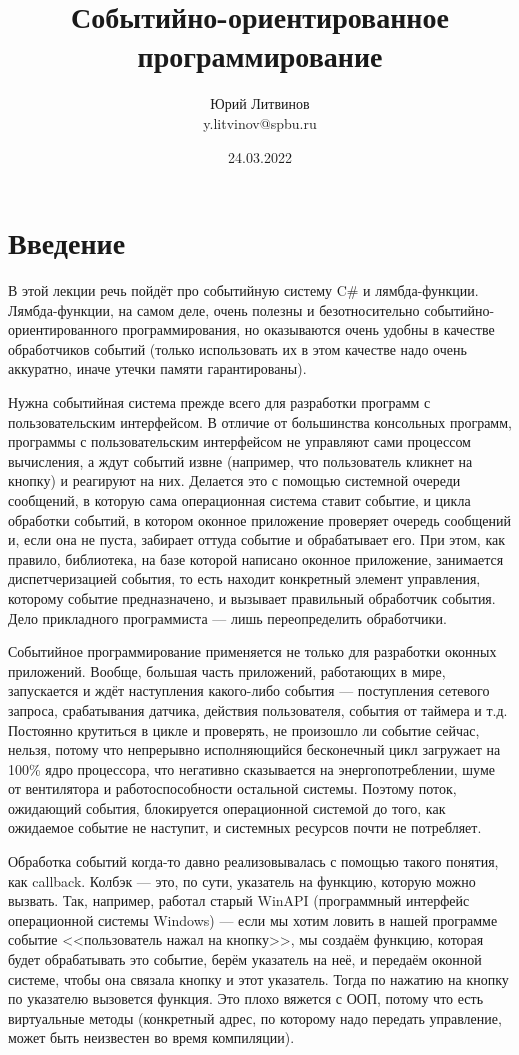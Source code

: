 \documentclass[a5paper]{article}
\title{Событийно-ориентированное программирование}
\author{Юрий Литвинов\\\small{y.litvinov@spbu.ru}}
\date{24.03.2022}
\begin{document}
\maketitle
\thispagestyle{empty}

\section{Введение}

В этой лекции речь пойдёт про событийную систему C\# и лямбда-функции. Лямбда-функции, на самом деле, очень полезны и безотносительно событийно-ориентированного программирования, но оказываются очень удобны в качестве обработчиков событий (только использовать их в этом качестве надо очень аккуратно, иначе утечки памяти гарантированы). 

Нужна событийная система прежде всего для разработки программ с пользовательским интерфейсом. В отличие от большинства консольных программ, программы с пользовательским интерфейсом не управляют сами процессом вычисления, а ждут событий извне (например, что пользователь кликнет на кнопку) и реагируют на них. Делается это с помощью системной очереди сообщений, в которую сама операционная система ставит событие, и цикла обработки событий, в котором оконное приложение проверяет очередь сообщений и, если она не пуста, забирает оттуда событие  и обрабатывает его. При этом, как правило, библиотека, на базе которой написано оконное приложение, занимается диспетчеризацией события, то есть находит конкретный элемент управления, которому событие предназначено, и вызывает правильный обработчик события. Дело прикладного программиста --- лишь переопределить обработчики.

Событийное программирование применяется не только для разработки оконных приложений. Вообще, большая часть приложений, работающих в мире, запускается и ждёт наступления какого-либо события --- поступления сетевого запроса, срабатывания датчика, действия пользователя, события от таймера и т.д. Постоянно крутиться в цикле и проверять, не произошло ли событие сейчас, нельзя, потому что непрерывно исполняющийся бесконечный цикл загружает на 100\% ядро процессора, что негативно сказывается на энергопотреблении, шуме от вентилятора и работоспособности остальной системы. Поэтому поток, ожидающий события, блокируется операционной системой до того, как ожидаемое событие не наступит, и системных ресурсов почти не потребляет.

Обработка событий когда-то давно реализовывалась с помощью такого понятия, как callback. Колбэк --- это, по сути, указатель на функцию, которую можно вызвать. Так, например, работал старый WinAPI (программный интерфейс операционной системы Windows) --- если мы хотим ловить в нашей программе событие <<пользователь нажал на кнопку>>, мы создаём функцию, которая будет обрабатывать это событие, берём указатель на неё, и передаём оконной системе, чтобы она связала кнопку и этот указатель. Тогда по нажатию на кнопку по указателю вызовется функция. Это плохо вяжется с ООП, потому что есть виртуальные методы (конкретный адрес, по которому надо передать управление, может быть неизвестен во время компиляции).
\end{document}
